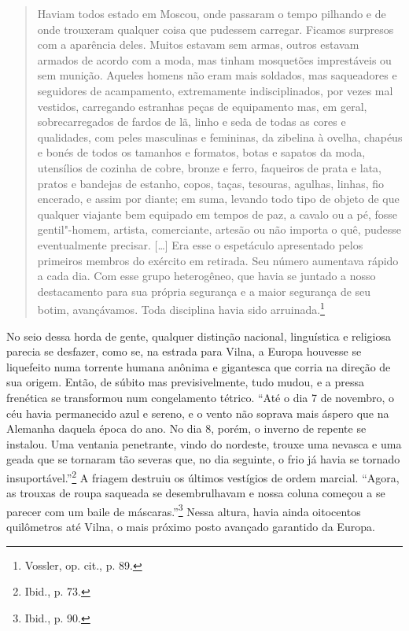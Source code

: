 \begin{quote}
Haviam todos estado em Moscou, onde passaram o tempo pilhando e de onde
trouxeram qualquer coisa que pudessem carregar. Ficamos surpresos com a
aparência deles. Muitos estavam sem armas, outros estavam armados de
acordo com a moda, mas tinham mosquetões imprestáveis ou sem munição.
Aqueles homens não eram mais soldados, mas saqueadores e seguidores de
acampamento, extremamente indisciplinados, por vezes mal vestidos,
carregando estranhas peças de equipamento mas, em geral, sobrecarregados
de fardos de lã, linho e seda de todas as cores e qualidades, com peles
masculinas e femininas, da zibelina à ovelha, chapéus e bonés de todos
os tamanhos e formatos, botas e sapatos da moda, utensílios de cozinha
de cobre, bronze e ferro, faqueiros de prata e lata, pratos e bandejas
de estanho, copos, taças, tesouras, agulhas, linhas, fio encerado, e
assim por diante; em suma, levando todo tipo de objeto de que qualquer
viajante bem equipado em tempos de paz, a cavalo ou a pé, fosse
gentil"-homem, artista, comerciante, artesão ou não importa o quê,
pudesse eventualmente precisar. [\ldots{}] Era esse o espetáculo
apresentado pelos primeiros membros do exército em retirada. Seu número
aumentava rápido a cada dia. Com esse grupo heterogêneo, que havia se
juntado a nosso destacamento para sua própria segurança e a maior
segurança de seu botim, avançávamos. Toda disciplina havia sido
arruinada.\footnote{Vossler, op. cit., p. 89.}
\end{quote}

No seio dessa horda de gente, qualquer distinção nacional, linguística e
religiosa parecia se desfazer, como se, na estrada para Vilna, a Europa
houvesse se liquefeito numa torrente humana anônima e gigantesca que
corria na direção de sua origem. Então, de súbito mas previsivelmente,
tudo mudou, e a pressa frenética se transformou num congelamento
tétrico. ``Até o dia 7 de novembro, o céu havia permanecido azul e
sereno, e o vento não soprava mais áspero que na Alemanha daquela época
do ano. No dia 8, porém, o inverno de repente se instalou. Uma ventania
penetrante, vindo do nordeste, trouxe uma nevasca e uma geada que se
tornaram tão severas que, no dia seguinte, o frio já havia se tornado
insuportável.''\footnote{Ibid., p. 73.} A friagem destruiu os últimos
vestígios de ordem marcial. ``Agora, as trouxas de roupa saqueada se
desembrulhavam e nossa coluna começou a se parecer com um baile de
máscaras.''\footnote{Ibid., p. 90.} Nessa altura, havia ainda oitocentos
quilômetros até Vilna, o mais próximo posto avançado garantido da
Europa.

